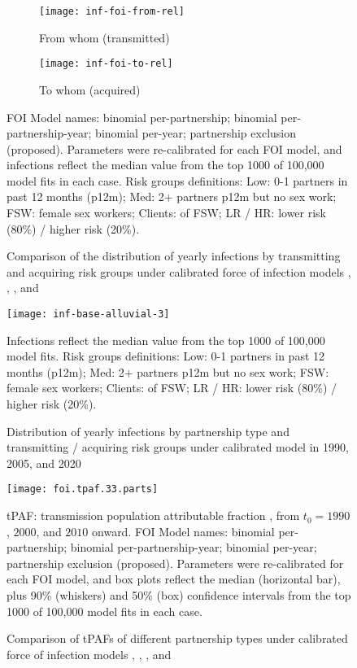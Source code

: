 \begin{figure}[h]
  \begin{subfigure}{\linewidth}
    \centerline{\texttt{[image: inf-foi-from-rel]}}
    \caption{From whom (transmitted)}
    \label{fig:inf.from}
  \end{subfigure}
  \begin{subfigure}{\linewidth}
    \centerline{\texttt{[image: inf-foi-to-rel]}}
    \caption{To whom (acquired)}
    \label{fig:inf.to}
  \end{subfigure}
  \caption{Comparison of the distribution of yearly infections
    by transmitting and acquiring risk groups
    under calibrated force of infection models , , , and }
  \label{fig:inf.frto}
  \floatfoot
  FOI Model names:
   binomial per-partnership;
   binomial per-partnership-year;
   binomial per-year;
   partnership exclusion (proposed).
  Parameters were re-calibrated for each FOI model,
  and infections reflect the median value from
  the top 1000 of 100,000 model fits in each case.
  Risk groups definitions:
  Low: 0-1 partners in past 12 months (p12m);
  Med: 2+ partners p12m but no sex work;
  FSW: female sex workers;
  Clients: of FSW;
  LR / HR: lower risk (80\%) / higher risk (20\%).
\end{figure}
\begin{figure}[h]
  \centerline{\texttt{[image: inf-base-alluvial-3]}}
  \caption{Distribution of yearly infections
    by partnership type and transmitting / acquiring risk groups
    under calibrated model  in 1990, 2005, and 2020}
  \label{fig:inf.alluvial}
  \floatfoot
  Infections reflect the median value from
  the top 1000 of 100,000 model  fits.
  Risk groups definitions:
  Low: 0-1 partners in past 12 months (p12m);
  Med: 2+ partners p12m but no sex work;
  FSW: female sex workers;
  Clients: of FSW;
  LR / HR: lower risk (80\%) / higher risk (20\%).
\end{figure}
\begin{figure}[h]
  \centerline{\texttt{[image: foi.tpaf.33.parts]}}
  \caption{Comparison of tPAFs of different partnership types
    under calibrated force of infection models , , , and }
  \label{fig:tpaf.33.parts}
  \floatfoot
  tPAF: transmission population attributable fraction \cite{Mishra2014},
  from $t_0 = 1990$, $2000$, and $2010$ onward.
  FOI Model names:
   binomial per-partnership;
   binomial per-partnership-year;
   binomial per-year;
   partnership exclusion (proposed).
  Parameters were re-calibrated for each FOI model,
  and box plots reflect the median (horizontal bar),
  plus 90\% (whiskers) and 50\% (box) confidence intervals from
  the top 1000 of 100,000 model fits in each case.
\end{figure}
